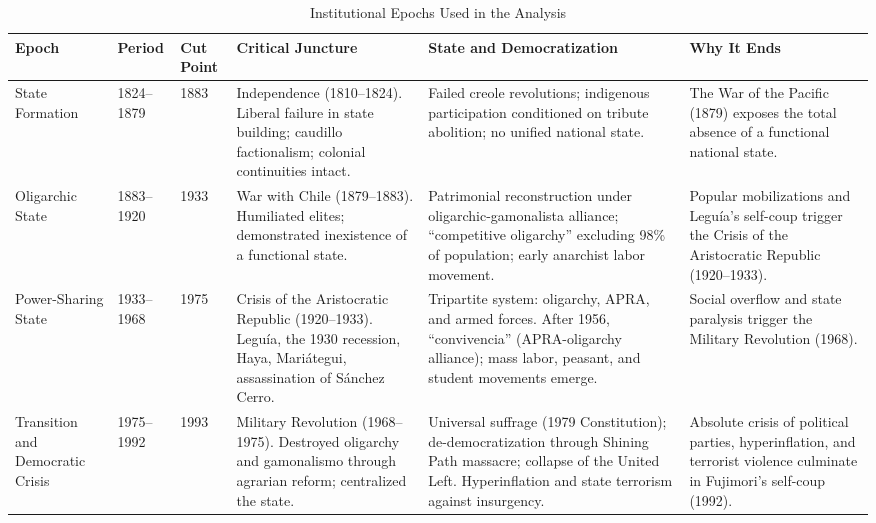 \documentclass[doc, 12pt, a4paper,floatsintext]{apa7}
\begin{document}
\begin{table}[h]
\centering
\caption{Institutional Epochs Used in the Analysis}
\label{tab:epochs}
\tiny
\renewcommand{\arraystretch}{1.35}
\begin{tabular}{p{1.5cm}p{1cm}p{0.8cm}p{3cm}p{3cm}p{2.6cm}}
\toprule
\textbf{Epoch} &
\textbf{Period} &
\textbf{Cut Point} &
\textbf{Critical Juncture} &
\textbf{State and Democratization} &
\textbf{Why It Ends} \\
\midrule

State Formation &
1824--1879 &
1883 &
Independence (1810--1824). Liberal failure in state building; caudillo factionalism; colonial continuities intact. &
Failed creole revolutions; indigenous participation conditioned on tribute abolition; no unified national state. &
The War of the Pacific (1879) exposes the total absence of a functional national state. \\

\midrule

Oligarchic State &
1883--1920 &
1933 &
War with Chile (1879--1883). Humiliated elites; demonstrated inexistence of a functional state. &
Patrimonial reconstruction under oligarchic-gamonalista alliance; ``competitive oligarchy'' excluding 98\% of population; early anarchist labor movement. &
Popular mobilizations and Leguía's self-coup trigger the Crisis of the Aristocratic Republic (1920--1933). \\

\midrule

Power-Sharing State &
1933--1968 &
1975 &
Crisis of the Aristocratic Republic (1920--1933). Leguía, the 1930 recession, Haya, Mariátegui, assassination of Sánchez Cerro. &
Tripartite system: oligarchy, APRA, and armed forces. After 1956, ``convivencia'' (APRA-oligarchy alliance); mass labor, peasant, and student movements emerge. &
Social overflow and state paralysis trigger the Military Revolution (1968). \\

\midrule

Transition and Democratic Crisis &
1975--1992 &
1993 &
Military Revolution (1968--1975). Destroyed oligarchy and gamonalismo through agrarian reform; centralized the state. &
Universal suffrage (1979 Constitution); de-democratization through Shining Path massacre; collapse of the United Left. Hyperinflation and state terrorism against insurgency. &
Absolute crisis of political parties, hyperinflation, and terrorist violence culminate in Fujimori's self-coup (1992). \\


\end{tabular}
\end{table}
\end{document}
